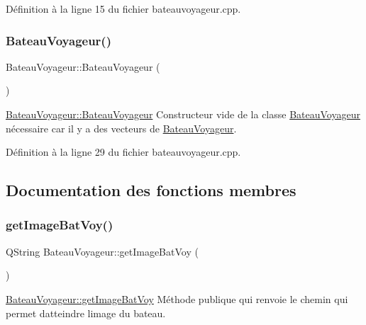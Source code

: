 Définition à la ligne 15 du fichier bateauvoyageur.\+cpp.

\mbox{\label{class_bateau_voyageur_ac327b0101a2586190a3afcd639f146cc}} 
\subsubsection{\texorpdfstring{Bateau\+Voyageur()}{BateauVoyageur()}\hspace{0.1cm}{\footnotesize\ttfamily [2/2]}}
{\footnotesize\ttfamily Bateau\+Voyageur\+::\+Bateau\+Voyageur (\begin{DoxyParamCaption}{ }\end{DoxyParamCaption})}



\hyperlink{class_bateau_voyageur_ab2351c630bf3661b8273c66017c1ed72}{Bateau\+Voyageur\+::\+Bateau\+Voyageur} Constructeur vide de la classe \hyperlink{class_bateau_voyageur}{Bateau\+Voyageur} nécessaire car il y a des vecteurs de \hyperlink{class_bateau_voyageur}{Bateau\+Voyageur}. 



Définition à la ligne 29 du fichier bateauvoyageur.\+cpp.



\subsection{Documentation des fonctions membres}
\mbox{\label{class_bateau_voyageur_a3154786b2f572d0c2a2ac975757295eb}} 
\subsubsection{\texorpdfstring{get\+Image\+Bat\+Voy()}{getImageBatVoy()}}
{\footnotesize\ttfamily Q\+String Bateau\+Voyageur\+::get\+Image\+Bat\+Voy (\begin{DoxyParamCaption}{ }\end{DoxyParamCaption})}



\hyperlink{class_bateau_voyageur_a3154786b2f572d0c2a2ac975757295eb}{Bateau\+Voyageur\+::get\+Image\+Bat\+Voy} Méthode publique qui renvoie le chemin qui permet d\textquotesingle{}atteindre l\textquotesingle{}image du bateau. 

